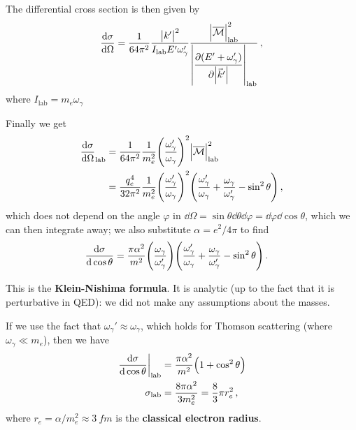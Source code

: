 \documentclass[main.tex]{subfiles}
\begin{document}
The differential cross section is then given by 
%
\begin{align}
\dv{\sigma }{\Omega } = \frac{1}{64 \pi^2} \frac{\abs{k'}^2}{I _{\text{lab}} E' \omega_{\gamma}'}
\frac{\abs{\mathcal{\overline{M}}}^2 _{\text{lab}}}{\displaystyle \abs{\pdv{(E' + \omega_{\gamma }')}{\abs{\vec{k}'}} }_{\text{lab}}}
\,,
\end{align}
%
where \(I _{\text{lab}} = m_e \omega_{\gamma }\)


Finally we get 
%
\begin{align}
\dv{\sigma }{\Omega } _{\text{lab}} &= \frac{1}{64 \pi^2} \frac{1}{m_e^2} \qty(\frac{\omega_{\gamma }'}{\omega_{\gamma }})^2 
\abs{\mathcal{\overline{M}}}^2 _{\text{lab}}  \\
&= \frac{q_e^{4}}{32 \pi^2} \frac{1}{m_e^2} \qty(\frac{\omega_{\gamma }'}{\omega_{\gamma }})^2 
\qty(\frac{\omega_{\gamma }'}{\omega_{\gamma }} + \frac{\omega_{\gamma }}{\omega_{\gamma }'} - \sin^2\theta )
\,,
\end{align}
%
which does not depend on the angle \(\varphi  \) in \(\dd{\Omega } = \sin \theta \dd{\theta } \dd{\varphi } = \dd{\varphi } \dd{\cos \theta }\), which we can then integrate away; we also substitute \(\alpha = e^2 / 4 \pi \) to find 
%
\begin{align}
\dv{\sigma }{\cos \theta } 
&= \frac{\pi \alpha^2}{m^2} \qty(\frac{\omega_{\gamma }}{\omega_{\gamma }'})
\qty(\frac{\omega_{\gamma }'}{\omega_{\gamma }} + \frac{\omega_{\gamma }}{\omega_{\gamma }'} - \sin^2\theta )
\,.
\end{align}

This is the \textbf{Klein-Nishima formula}. It is analytic (up to the fact that it is perturbative in QED): we did not make any assumptions about the masses. 

If we use the fact that \(\omega_{\gamma }' \approx \omega_{\gamma } \), which holds for Thomson scattering (where \(\omega_{\gamma } \ll m_e \)), then we have 
%
\begin{align}
\eval{\dv{\sigma }{\cos \theta }}_{\text{lab}} &= \frac{\pi \alpha^2}{m^2}
\qty( 1 + \cos^2 \theta )  \\
\sigma _{\text{lab}} &= \frac{8 \pi \alpha^2}{3 m_e^2} = \frac{8}{3} \pi r_e^2
\,,
\end{align}
%
where \(r_e = \alpha / m_e^2 \approx \SI{3}{fm}\) is the \textbf{classical electron radius}. 
\end{document}
